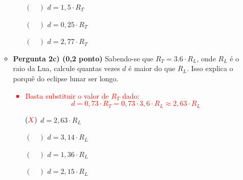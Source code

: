 \documentclass[a4paper, 12pt]{article}
\newcommand{\red}[1]{\textcolor{red}{#1}}
\begin{document}
\begin{flushleft}
\begin{itemize}
\begin{itemize}
\begin{itemize}
                            \item[$(\quad)$] $d = 1,5 \cdot R_T$
                            \item[$(\quad)$] $d = 0,25 \cdot R_T$
                            \item[$(\quad)$] $d = 2,77 \cdot R_T$
                        \end{itemize}
                    \item \textbf{Pergunta 2c) (0,2 ponto)} Sabendo-se  que $R_T = 3.6 \cdot R_L$,  onde $R_L$ é o raio da Lua, calcule quantas vezes $d$ é maior do que $R_L$. Isso explica o porquê do eclipse lunar ser longo.
                        \red{\begin{itemize}
                            \item Basta substituir o valor de $R_T$ dado:
                                \begin{equation*}
                                    d=0,73 \cdot R_T = 0,73 \cdot 3,6 \cdot R_L \approx 2,63 \cdot R_L
                                \end{equation*}
                        \end{itemize}}
                        \begin{itemize}
                            \item[$(\red{X})$] $d = 2,63 \cdot R_L$
                            \item[$(\quad)$] $d = 3,14 \cdot R_L$
                            \item[$(\quad)$] $d = 1,36 \cdot R_L$
                            \item[$(\quad)$] $d = 2,15 \cdot R_L$
                        \end{itemize}
                \end{itemize}


\end{itemize}
\end{flushleft}
\end{document}

